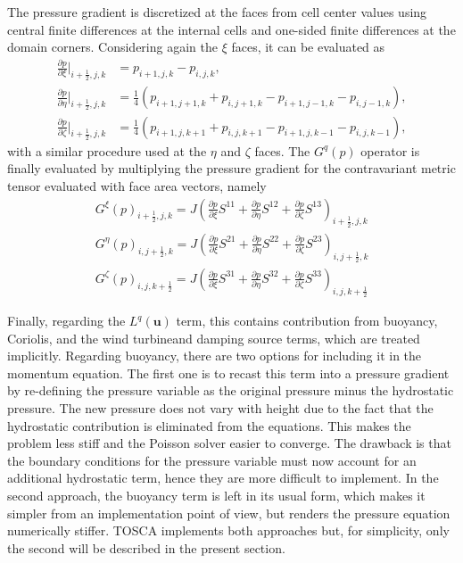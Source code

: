 The pressure gradient is discretized at the faces from cell center values using central finite differences at the internal cells and one-sided finite differences at the domain corners. Considering again the $\xi$ faces, it can be evaluated as
\begin{align}
	\frac{\partial p}{\partial \xi}\bigg|_{i+\frac{1}{2},j,k} &= p_{i+1,j,k} - p_{i,j,k}, \nonumber \\
	\frac{\partial p}{\partial \eta}\bigg|_{i+\frac{1}{2},j,k} &= \frac{1}{4}\left(p_{i+1,j+1,k} + p_{i,j+1,k} - p_{i+1,j-1,k} - p_{i,j-1,k}\right), \nonumber \\
	\frac{\partial p}{\partial \zeta}\bigg|_{i+\frac{1}{2},j,k} &= \frac{1}{4}\left(p_{i+1,j,k+1} + p_{i,j,k+1} - p_{i+1,j,k-1} - p_{i,j,k-1}\right), \nonumber
\end{align}
with a similar procedure used at the $\eta$ and $\zeta$ faces. The $G^q(p)$ operator is finally evaluated by multiplying the pressure gradient for the contravariant metric tensor evaluated with face area vectors, namely
\begin{align}
	G^\xi(p)_{i+\frac{1}{2},j,k} = J
	\left(
		\frac{\partial p}{\partial \xi} S^{11} + 
		\frac{\partial p}{\partial \eta} S^{12} + 
		\frac{\partial p}{\partial \zeta} S^{13} 
	\right)_{i+\frac{1}{2},j,k} \label{eq:gradpOperatorCsi} \\
	G^\eta(p)_{i,j+\frac{1}{2},k} = J
	\left(
	\frac{\partial p}{\partial \xi} S^{21} + 
	\frac{\partial p}{\partial \eta} S^{22} + 
	\frac{\partial p}{\partial \zeta} S^{23} 
	\right)_{i,j+\frac{1}{2},k} \label{eq:gradpOperatorEta} \\
	G^\zeta(p)_{i,j,k+\frac{1}{2}} = J
	\left(
	\frac{\partial p}{\partial \xi} S^{31} + 
	\frac{\partial p}{\partial \eta} S^{32} + 
	\frac{\partial p}{\partial \zeta} S^{33} 
	\right)_{i,j,k+\frac{1}{2}} \label{eq:gradpOperatorZet} 
\end{align}

Finally, regarding the $L^q(\mathbf{u})$ term, this contains contribution from buoyancy, Coriolis, and the wind turbineand damping source terms, which are treated implicitly. Regarding buoyancy, there are two options for including it in the momentum equation. The first one is to recast this term into a pressure gradient by re-defining the pressure variable as the original pressure minus the hydrostatic pressure. The new pressure does not vary with height due to the fact that the hydrostatic contribution is eliminated from the equations. This makes the problem less stiff and the Poisson solver easier to converge. The drawback is that the boundary conditions for the pressure variable must now account for an additional hydrostatic term, hence they are more difficult to implement. In the second approach, the buoyancy term is left in its usual form, which makes it simpler from an implementation point of view, but renders the pressure equation numerically stiffer. TOSCA implements both approaches but, for simplicity, only the second will be described in the present section. 

